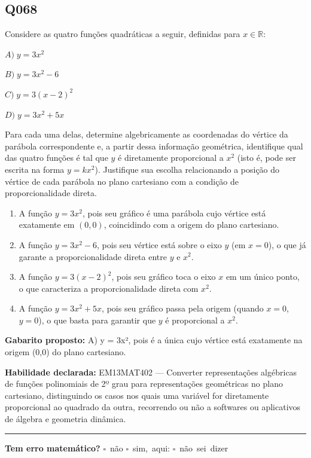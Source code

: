 \documentclass[11pt,a4paper]{article}
\begin{document}
\begin{samepage}
\subsection*{Q068}
Considere as quatro funções quadráticas a seguir, definidas para $x \in \mathbb{R}$:

$A) \; y = 3x^2$

$B) \; y = 3x^2 - 6$

$C) \; y = 3(x-2)^2$

$D) \; y = 3x^2 + 5x$

Para cada uma delas, determine algebricamente as coordenadas do vértice da parábola correspondente e, a partir dessa informação geométrica, identifique qual das quatro funções é tal que $y$ é diretamente proporcional a $x^2$ (isto é, pode ser escrita na forma $y = kx^2$). Justifique sua escolha relacionando a posição do vértice de cada parábola no plano cartesiano com a condição de proporcionalidade direta.
\begin{enumerate}[label=(\alph*),nosep,leftmargin=*]
\item A função $y = 3x^2$, pois seu gráfico é uma parábola cujo vértice está exatamente em $(0,0)$, coincidindo com a origem do plano cartesiano.
\item A função $y = 3x^2 - 6$, pois seu vértice está sobre o eixo $y$ (em $x=0$), o que já garante a proporcionalidade direta entre $y$ e $x^2$.
\item A função $y = 3(x-2)^2$, pois seu gráfico toca o eixo $x$ em um único ponto, o que caracteriza a proporcionalidade direta com $x^2$.
\item A função $y = 3x^2 + 5x$, pois seu gráfico passa pela origem (quando $x=0$, $y=0$), o que basta para garantir que $y$ é proporcional a $x^2$.
\end{enumerate}

\textbf{Gabarito proposto:} A) y = 3x², pois é a única cujo vértice está exatamente na origem (0,0) do plano cartesiano.

\textbf{Habilidade declarada:} EM13MAT402 --- Converter representações algébricas de funções polinomiais de 2º grau para representações geométricas no plano cartesiano, distinguindo os casos nos quais uma variável for diretamente proporcional ao quadrado da outra, recorrendo ou não a softwares ou aplicativos de álgebra e geometria dinâmica.
\end{samepage}

\noindent\rule{\linewidth}{0.4pt}
\textbf{Tem erro matemático?}\quad
\mbox{$\square$~não} \quad \mbox{$\square$~sim, aqui:} \underline{\hspace{5cm}}
\quad \mbox{$\square$~não sei dizer}
\end{document}
